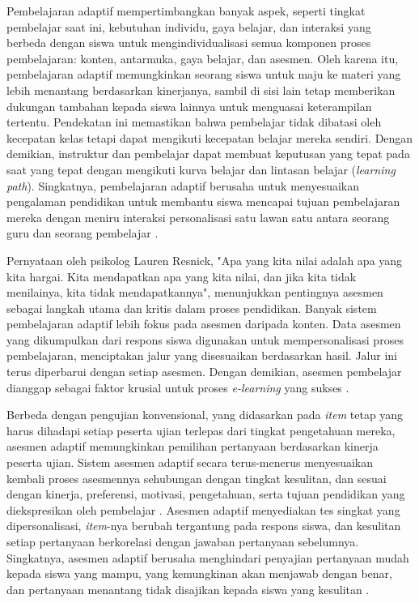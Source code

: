 Pembelajaran adaptif mempertimbangkan banyak aspek, seperti tingkat pembelajar saat
ini, kebutuhan individu, gaya belajar, dan interaksi yang berbeda dengan siswa untuk
mengindividualisasi semua komponen proses pembelajaran: konten, antarmuka, gaya
belajar, dan asesmen. Oleh karena itu, pembelajaran adaptif memungkinkan seorang
siswa untuk maju ke materi yang lebih menantang berdasarkan kinerjanya, sambil di
sisi lain tetap memberikan dukungan tambahan kepada siswa lainnya untuk menguasai
keterampilan tertentu. Pendekatan ini memastikan bahwa pembelajar tidak dibatasi
oleh kecepatan kelas tetapi dapat mengikuti kecepatan belajar mereka sendiri.
Dengan demikian, instruktur dan pembelajar dapat membuat keputusan yang tepat
pada saat yang tepat dengan mengikuti kurva belajar dan lintasan belajar
(\textit{learning path}). Singkatnya, pembelajaran adaptif berusaha untuk menyesuaikan
pengalaman pendidikan untuk membantu siswa mencapai tujuan pembelajaran mereka
dengan meniru interaksi personalisasi satu lawan satu antara seorang guru dan
seorang pembelajar \autocite{Ihichr2024}.

Pernyataan oleh psikolog Lauren Resnick, "Apa yang kita nilai adalah apa yang kita
hargai. Kita mendapatkan apa yang kita nilai, dan jika kita tidak menilainya, kita 
tidak mendapatkannya", menunjukkan pentingnya asesmen sebagai langkah utama dan
kritis dalam proses pendidikan. Banyak sistem pembelajaran adaptif lebih fokus
pada asesmen daripada konten. Data asesmen yang dikumpulkan dari respons siswa
digunakan untuk mempersonalisasi proses pembelajaran, menciptakan jalur yang
disesuaikan berdasarkan hasil. Jalur ini terus diperbarui dengan setiap asesmen.
Dengan demikian, asesmen pembelajar dianggap sebagai faktor krusial untuk proses
\textit{e-learning} yang sukses \autocite{Ihichr2024}.

Berbeda dengan pengujian konvensional, yang didasarkan pada \textit{item} tetap yang
harus dihadapi setiap peserta ujian terlepas dari tingkat pengetahuan mereka,
asesmen adaptif memungkinkan pemilihan pertanyaan berdasarkan kinerja peserta
ujian. Sistem asesmen adaptif secara terus-menerus menyesuaikan kembali proses
asesmennya sehubungan dengan tingkat kesulitan, dan sesuai dengan kinerja,
preferensi, motivasi, pengetahuan, serta tujuan pendidikan yang diekspresikan
oleh pembelajar \autocite{Halkiopoulos2024}. Asesmen adaptif menyediakan tes
singkat yang dipersonalisasi, \textit{item}-nya berubah tergantung pada respons
siswa, dan kesulitan setiap pertanyaan berkorelasi dengan jawaban pertanyaan
sebelumnya. Singkatnya, asesmen adaptif berusaha menghindari penyajian pertanyaan
mudah kepada siswa yang mampu, yang kemungkinan akan menjawab dengan benar, dan
pertanyaan menantang tidak disajikan kepada siswa yang kesulitan \autocite{Ihichr2024}.


